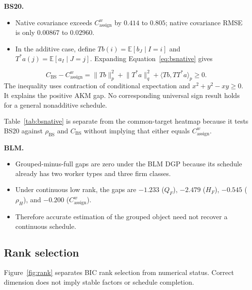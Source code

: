 \documentclass[11pt]{article}
\newcommand{\E}{\mathbb{E}}
\newcommand{\QF}{Q_F}
\newcommand{\HF}{H_F}
\newcommand{\rhoH}{\rho_H}
\newcommand{\Cassign}{C^{w}_{\mathrm{assign}}}
\newcommand{\CBS}{C_{\mathrm{BS}}}
\newcommand{\rhoBS}{\rho_{\mathrm{BS}}}
\begin{document}
\textbf{BS20.}
\begin{itemize}
\item Native covariance exceeds $\Cassign$ by $0.414$ to $0.805$; native
covariance RMSE is only $0.00867$ to $0.02960$.
\item In the additive case, define
$Tb(i)=\E[b_J\mid I=i]$ and $T^*a(j)=\E[a_I\mid J=j]$.  Expanding
Equation~\eqref{eq:bsnative} gives
\end{itemize}
\begin{equation}
\CBS-\Cassign
=\lVert Tb\rVert_p^2+\lVert T^*a\rVert_q^2
+\langle Tb,TT^*a\rangle_p\ge0. \label{eq:bsgap}
\end{equation}
The inequality uses contraction of conditional expectation and
$x^2+y^2-xy\ge0$.  It explains the positive AKM gap.  No corresponding
universal sign result holds for a general nonadditive schedule.

Table~\ref{tab:bsnative} is separate from the common-target heatmap because it
tests BS20 against $\rhoBS$ and $\CBS$ without implying that either equals
$\Cassign$.

\begin{table}[H]
\centering
\caption{BS20 accuracy against its native correlation and covariance targets}
\label{tab:bsnative}
\small
\resizebox{\textwidth}{!}{}
\end{table}

\textbf{BLM.}
\begin{itemize}
\item Grouped-minus-full gaps are zero under the BLM DGP because its schedule
already has two worker types and three firm classes.
\item Under continuous low rank, the gaps are $-1.233$ ($\QF$), $-2.479$
($\HF$), $-0.545$ ($\rhoH$), and $-0.200$ ($\Cassign$).
\item Therefore accurate estimation of the grouped object need not recover a
continuous schedule.
\end{itemize}

\subsection{Rank selection}

Figure~\ref{fig:rank} separates BIC rank selection from numerical status.
Correct dimension does not imply stable factors or schedule completion.

\begin{table}[H]
\centering
\caption{BIC selection counts and separate project diagnostic-pass rate}
\label{tab:rank}

\end{table}
\end{document}
